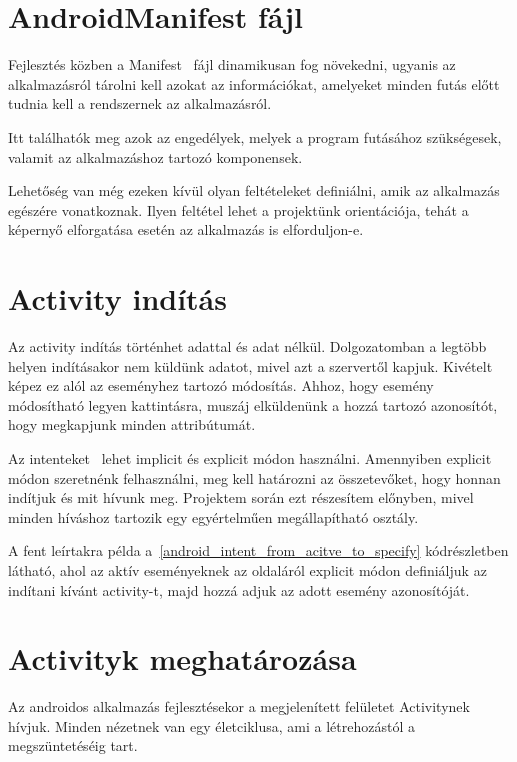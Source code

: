 \documentclass[
]{thesis-ekf}
\theoremstyle{definition}
\theoremstyle{remark}
\begin{document}
	\section{AndroidManifest fájl}
	Fejlesztés közben a Manifest~\cite{android_manifest} fájl dinamikusan fog növekedni, ugyanis az alkalmazásról tárolni kell azokat az információkat, amelyeket minden futás előtt tudnia kell a rendszernek az alkalmazásról.
	
	Itt találhatók meg azok az engedélyek, melyek a program futásához szükségesek, valamit az alkalmazáshoz tartozó komponensek. 
	
	Lehetőség van még ezeken kívül olyan feltételeket definiálni, amik az alkalmazás egészére vonatkoznak. Ilyen feltétel lehet a projektünk orientációja, tehát a képernyő elforgatása esetén az alkalmazás is elforduljon-e.
	
	\section{Activity indítás}
	Az activity indítás történhet adattal és adat nélkül. Dolgozatomban a legtöbb helyen indításakor nem küldünk adatot, mivel azt a szervertől kapjuk. Kivételt képez ez alól az eseményhez tartozó módosítás. Ahhoz, hogy esemény módosítható legyen kattintásra, muszáj elküldenünk a hozzá tartozó azonosítót, hogy megkapjunk minden attribútumát.
	
	Az intenteket~\cite{android_intent} lehet implicit és explicit módon használni. Amennyiben explicit módon szeretnénk felhasználni, meg kell határozni az összetevőket, hogy honnan indítjuk és mit hívunk meg. Projektem során ezt részesítem előnyben, mivel minden híváshoz tartozik egy egyértelműen megállapítható osztály.
	
	A fent leírtakra példa a~\ref{android_intent_from_acitve_to_specify} kódrészletben látható, ahol az aktív eseményeknek az oldaláról explicit módon definiáljuk az indítani kívánt activity-t, majd hozzá adjuk az adott esemény azonosítóját.
	
	
	
	\section{Activityk meghatározása}
	Az androidos alkalmazás fejlesztésekor a megjelenített felületet Activitynek hívjuk. Minden nézetnek van egy életciklusa, ami a létrehozástól a megszüntetéséig tart.
	
\end{document}
